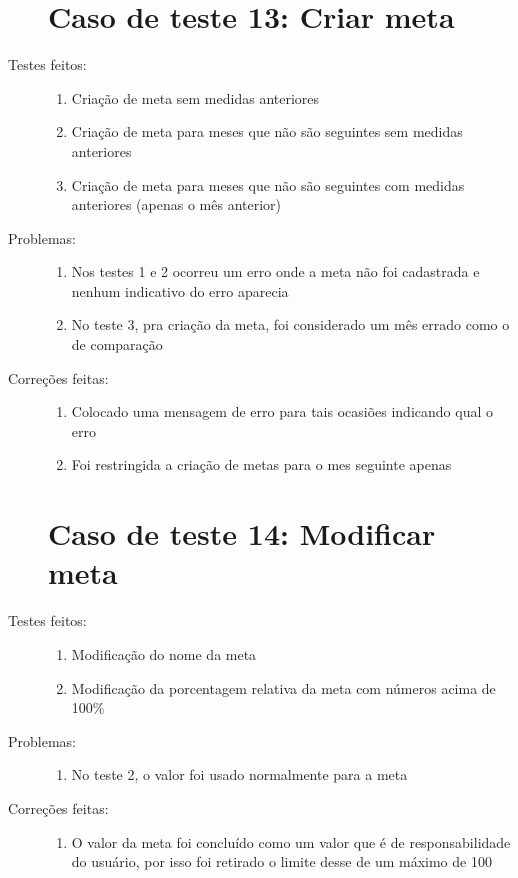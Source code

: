 \begin{description}
  \section{Caso de teste 13: Criar meta}
  \item[Testes feitos:]
  \begin{enumerate}
    \item{Criação de meta sem medidas anteriores}
    \item{Criação de meta para meses que não são seguintes sem medidas anteriores}
    \item{Criação de meta para meses que não são seguintes com medidas anteriores (apenas o mês anterior)}
  \end{enumerate}
  \item[Problemas:]
  \begin{enumerate}
    \item{Nos testes 1 e 2 ocorreu um erro onde a meta não foi cadastrada e nenhum indicativo do erro aparecia}
    \item{No teste 3, pra criação da meta, foi considerado um mês errado como o de comparação}
  \end{enumerate}
  \item[Correções feitas:]
  \begin{enumerate}
    \item{Colocado uma mensagem de erro para tais ocasiões indicando qual o erro}
    \item{Foi restringida a criação de metas para o mes seguinte apenas}
  \end{enumerate}  

  \section{Caso de teste 14: Modificar meta}
  \item[Testes feitos:]
  \begin{enumerate}
    \item{Modificação do nome da meta}
    \item{Modificação da porcentagem relativa da meta com números acima de 100\%}
  \end{enumerate}
  \item[Problemas:]
  \begin{enumerate}
    \item{No teste 2, o valor foi usado normalmente para a meta}
  \end{enumerate}
  \item[Correções feitas:]
  \begin{enumerate}
    \item{O valor da meta foi concluído como um valor que é de responsabilidade do usuário, por isso foi retirado o limite desse de um máximo de 100}
  \end{enumerate}  


\end{description}
